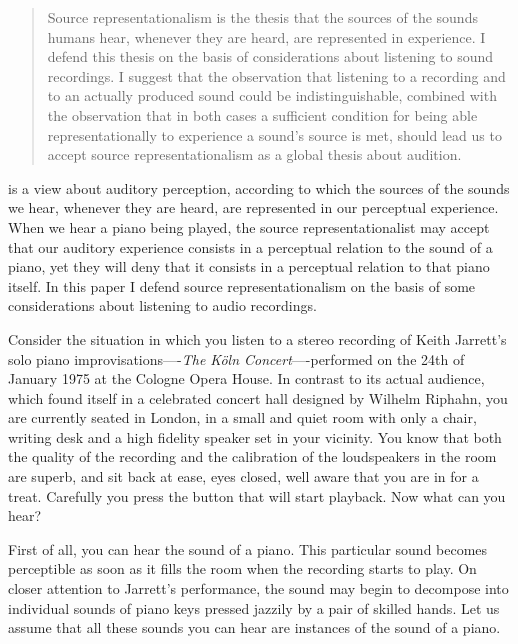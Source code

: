 \documentclass[sloppy, journal, git, bytitle, dodraft]{humapap}
\begin{document}
\documenttitle

\begin{abstract}
Source representationalism is the thesis that the sources of the sounds humans hear, whenever they are heard, are represented in experience. I defend this thesis on the basis of considerations about listening to sound recordings. I suggest that the observation that listening to a recording and to an actually produced sound could be indistinguishable, combined with the observation that in both cases a sufficient condition for being able representationally to experience a sound's source is met, should lead us to accept source representationalism as a global thesis about audition. 
\end{abstract}	

 is a view about auditory perception,
according to which the sources of the sounds we hear, whenever they are
heard, are represented in our perceptual experience. When we hear a
piano being played, the source representationalist may accept that our
auditory experience consists in a perceptual relation to the sound of a
piano, yet they will deny that it consists in a perceptual relation to
that piano itself. In this paper I defend source representationalism on
the basis of some considerations about listening to audio recordings.



\sect Consider the situation in which you listen to a stereo recording of
Keith Jarrett's solo piano improvisations----\emph{The Köln
Concert}----performed on the 24th of January 1975 at the Cologne Opera
House. In contrast to its actual audience, which found itself in a
celebrated concert hall designed by Wilhelm Riphahn, you are currently
seated in London, in a small and quiet room with only a chair, writing
desk and a high fidelity speaker set in your vicinity. You know that
both the quality of the recording and the calibration of the
loudspeakers in the room are superb, and sit back at ease, eyes closed,
well aware that you are in for a treat. Carefully you press the button
that will start playback. Now what can you hear?



\sect First of all, you can hear the sound of a piano. This particular sound
becomes perceptible as soon as it fills the room when the recording
starts to play. On closer attention to Jarrett's performance, the sound
may begin to decompose into individual sounds of piano keys pressed
jazzily by a pair of skilled hands. Let us assume that all these sounds
you can hear are instances of the sound of a piano.
\end{document}
